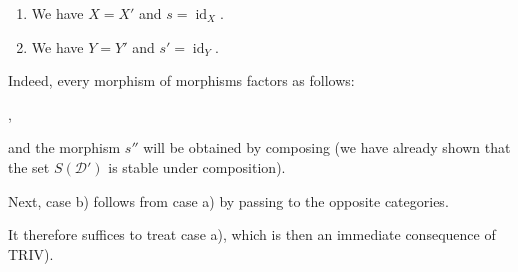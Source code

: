 \begin{enumerate}
\renewcommand{\labelenumi}{\emph{\alph{enumi})}}
  \item {}%
  We have $X=X'$ and $s=\operatorname{id}_X$.
  \item {}%
  We have $Y=Y'$ and $s'=\operatorname{id}_Y$.
\end{enumerate}

Indeed, every morphism of morphisms factors as follows:

\begin{center}
  \quad ,
\end{center}

\noindent and the morphism $s''$ will be obtained by composing (we have already
shown that the set $S(\mathcal D')$ is stable under composition).

Next, case b) follows from case a) by passing to the opposite categories.

It therefore suffices to treat case a), which is then an immediate consequence
of TRIV).

\endgroup
